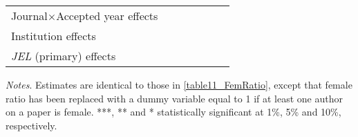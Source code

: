 \begin{table}
\begin{threeparttable}
\begin{tabular}{p{3.78cm}S@{}S@{}S@{}S@{}S@{}S@{}}
            Journal\(\times\)Accepted year effects &               &               &           {}   &               &               &           {}   \\
            Institution effects           &           {}   &           {}   &           {}   &           {}   &           {}   &           {}   \\
            \textit{JEL} (primary) effects&               &               &               &           {}   &           {}   &           {}   \\
            \bottomrule
        \end{tabular}
        \begin{tablenotes}
            \tiny
            \item \textit{Notes}. Estimates are identical to those in \autoref{table11_FemRatio}, except that female ratio has been replaced with a dummy variable equal to 1 if at least one author on a paper is female. ***, ** and * statistically significant at 1\%, 5\% and 10\%, respectively.
        \end{tablenotes}
    \end{threeparttable}
\end{table}